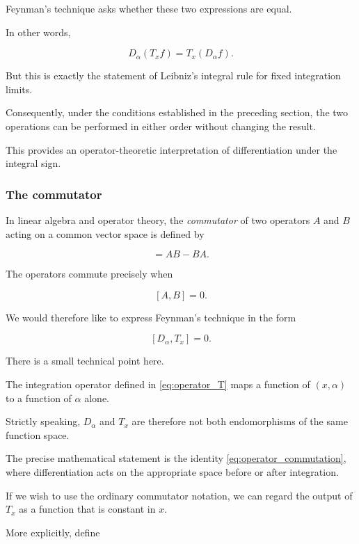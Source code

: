 \documentclass[11pt,a4paper]{article}
\theoremstyle{definition}
\theoremstyle{remark}
\begin{document}
Feynman's technique asks
whether these two
expressions are equal.

In other words,

\begin{equation}
    \boxed{
    D_\alpha(T_xf)
    =
    T_x(D_\alpha f).
    }
    \label{eq:operator_commutation}
\end{equation}

But this is exactly
the statement of
Leibniz's integral rule
for fixed integration limits.

Consequently, under
the conditions established
in the preceding section,
the two operations can
be performed in either
order without changing
the result.

This provides an
operator-theoretic
interpretation of
differentiation under
the integral sign.

\subsubsection*{The commutator}

In linear algebra and
operator theory, the
\emph{commutator} of two
operators $A$ and $B$
acting on a common
vector space is defined by

\begin{equation}
    [A,B]=AB-BA.
    \label{eq:commutator_definition}
\end{equation}

The operators commute
precisely when

\[
    [A,B]=0.
\]

We would therefore like
to express Feynman's
technique in the form

\[
    [D_\alpha,T_x]=0.
\]

There is a small technical
point here.

The integration operator
defined in
\eqref{eq:operator_T}
maps a function of
$(x,\alpha)$ to a function
of $\alpha$ alone.

Strictly speaking,
$D_\alpha$ and $T_x$
are therefore not both
endomorphisms of the
same function space.

The precise mathematical
statement is the identity
\eqref{eq:operator_commutation},
where differentiation acts
on the appropriate space
before or after integration.

If we wish to use the
ordinary commutator notation,
we can regard the output
of $T_x$ as a function
that is constant in $x$.

More explicitly, define
\end{document}
